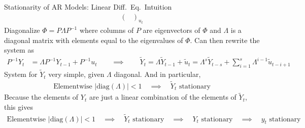 \documentclass[aspectratio=169, handout]{beamer}
\newcommand{\diag}{\text{diag}}
\begin{document}
{\begin{frame}{%
    Stationarity of AR Models: Linear Diff.\ Eq.\ Intuition
}
\begin{align*}
{\begin{pmatrix}
  \end{pmatrix}
  }_{u_t}
\end{align*}
Diagonalize $\Phi=P\Lambda P^{-1}$ where columns of $P$ are eigenvectors
of $\Phi$ and $\Lambda$ is a diagonal matrix with elements equal to the
\alert{eigenvalues} of $\Phi$.
Can then rewrite the system as
\begin{align*}
  P^{-1}{Y}_t &= \Lambda P^{-1}Y_{t-1} + P^{-1}u_t
  \qquad\implies\qquad
  \tilde{Y}_t
  = \Lambda \tilde{Y}_{t-1} + \tilde{u}_t
  =
  \Lambda^s \tilde{Y}_{t-s}
  +
  \sum_{i=1}^s
  \Lambda^{i-1} \tilde{u}_{t-i+1}
\end{align*}
System for $\tilde{Y}_t$ very simple, given $\Lambda$
diagonal.
And in particular,
\begin{align*}
  \text{Elementwise $|\diag(\Lambda)|<1$}
  \quad\implies\quad
  \text{$\tilde{Y}_t$ stationary}
\end{align*}
Because the elements of $Y_t$ are just a linear combination of the
elements of $\tilde{Y}_t$, this gives
\begin{align*}
  \text{Elementwise $|\diag(\Lambda)|<1$}
  \quad\implies\quad
  \text{$\tilde{Y}_t$ stationary}
  \quad\implies\quad
  \text{$Y_t$ stationary}
  \quad\implies\quad
  \text{$y_t$ stationary}
\end{align*}
\end{frame}
}
\end{document}
